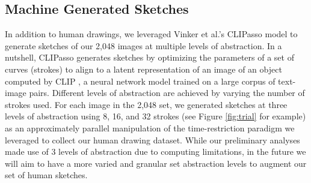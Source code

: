 \documentclass[10pt,letterpaper]{article}
\begin{document}
\subsection{Machine Generated Sketches}
In addition to human drawings, we leveraged Vinker et al.'s \citeyear{vinker2022clipasso} CLIPasso model to generate sketches of our 2,048 images at multiple levels of abstraction.
In a nutshell, CLIPasso generates sketches by optimizing the parameters of a set of curves (strokes) to align to a latent representation of an image of an object computed by CLIP \cite{radford2021learning}, a neural network model trained on a large corpus of text-image pairs.
Different levels of abstraction are achieved by varying the number of strokes used. 
For each image in the 2,048 set, we generated sketches at three levels of abstraction using 8, 16, and 32 strokes (see Figure \ref{fig:trial} for example) as an approximately parallel manipulation of the time-restriction paradigm we leveraged to collect our human drawing dataset. 
While our preliminary analyses made use of 3 levels of abstraction due to computing limitations, in the future we will aim to have a more varied and granular set abstraction levels to augment our set of human sketches.





\end{document}
